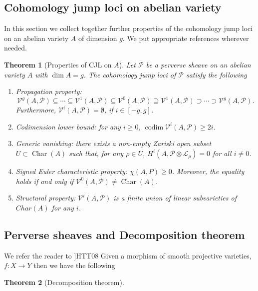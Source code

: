 \documentclass[11pt,reqno]{amsart}
\newtheorem{theorem}{Theorem}[section]
\theoremstyle{definition}
\theoremstyle{remark}
\theoremstyle{cited}
\theoremstyle{citeddef}
\DeclareMathOperator{\codim}{codim}              %
\DeclareMathOperator{\Char}{Char}
\newcommand{\sL}{\mathcal{L}}
\newcommand{\sP}{\mathcal{P}}
\newcommand\sV{{\mathcal V}}
\begin{document}
\subsection{Cohomology jump loci on abelian variety}
In this section we collect together further properties of the
cohomology jump loci on an abelian variety $A$ of dimension $g$.
We put appropriate references wherever needed.

\begin{theorem}[Properties of CJL on $A$]
Let $\sP$ be a perverse sheave on an abelian variety $A$ with $\dim A = g$.
The
cohomology jump loci of $\sP$ satisfy the following
\begin{enumerate}
	\item Propagation property:
\[\sV^g(A, \sP) \subseteq \cdots\subseteq \sV^1(A, \sP) 
\subseteq \sV^0(A, \sP) \supseteq \sV^1(A, \sP) \supset\cdots\supset \sV^g(A, \sP).\]
Furthermore, $\sV^i(A, \sP) = \emptyset$, if $i \in [-g, g]$.
\item Codimension lower bound: for any $i \geq 0$,
$\codim \sV^i(A, \sP) \geq 2i$.
\item Generic vanishing: there exists a non-empty Zariski open subset $U \subset \Char(A)$
such that, for any $\rho\in U$, $H^i(A, \sP 
\otimes \sL_{\rho}) = 0$ for all $i \neq 0$.
\item Signed Euler characteristic property:
$\chi(A, P) \geq 0$.
Moreover, the equality holds if and only if $\sV^0(A, \sP) \neq \Char(A)$.
\item Structural property: $\sV^i(A, \sP)$ is a finite union of linear subvarieties of $Char(A)$ for any $i$.
\end{enumerate}
\label{thm:gvperverse}
\end{theorem} 



\subsection{Perverse sheaves and Decomposition theorem}
We refer the reader to
]HTT08 
Given a morphism of smooth projective varieties, 
$f\colon X\to Y$ then we have the following
\begin{theorem}[Decomposition theorem]


\label{thm:}
\end{theorem}
\end{document}
